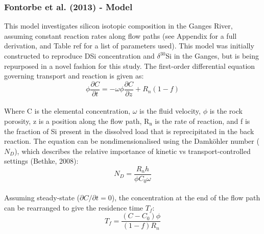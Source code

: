 \FloatBarrier

\newpage

\subsubsection*{Fontorbe et al. (2013) - Model}

This model investigates silicon isotopic composition in the Ganges River, assuming constant reaction rates along flow paths (see Appendix for a full derivation, and Table ref for a list of parameters used). This model was initially constructed to reproduce DSi concentration and $\delta^{30}$Si in the Ganges, but is being repurposed in a novel fashion for this study. The first-order differential equation governing transport and reaction is given as:\\

    \begin{equation}
    \phi \frac{\partial C}{\partial t} = -\omega \phi \frac{\partial C}{\partial z} + R_n(1-f)
    \end{equation}\\

Where C is the elemental concentration, $\omega$ is the fluid velocity, $\phi$ is the rock porosity, z is a position along the flow path, R$_\text{n}$ is the rate of reaction, and f is the fraction of Si present in the dissolved load that is reprecipitated in the back reaction. The equation can be nondimensionalised using the Damköhler number (\(N_D\)), which describes the relative importance of kinetic vs transport-controlled settings (Bethke, 2008):\\

\begin{equation}
    N_D = \frac{R_n h}{\phi C_0 \omega}
\end{equation}\\

Assuming steady-state (\(\partial C/\partial t = 0\)), the concentration at the end of the flow path can be rearranged to give the residence time \(T_f\):\\

\begin{equation}
    T_f = \frac{(C - C_0)\phi}{(1-f)R_n}
\end{equation}


